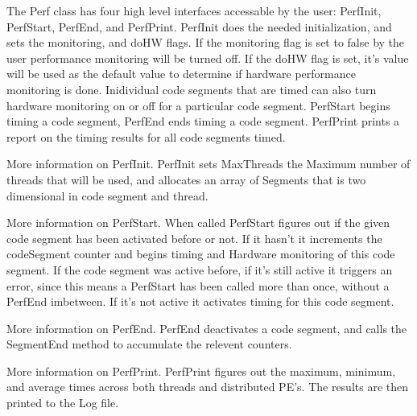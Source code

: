 %


The Perf class has four high level interfaces accessable by the user:
PerfInit, PerfStart, PerfEnd, and PerfPrint. PerfInit does the needed
initialization, and sets the monitoring, and doHW flags. If the monitoring
flag is set to false by the user performance monitoring will be turned
off. If the doHW flag is set, it's value will be used as the default value
to determine if hardware performance monitoring is done. Inidividual code
segments that are timed can also turn hardware monitoring on or off for
a particular code segment. PerfStart begins timing a code segment, PerfEnd
ends timing a code segment. PerfPrint prints a report on the timing results
for all code segments timed.

More information on PerfInit. PerfInit sets MaxThreads the Maximum number of 
threads that will be used, and allocates an array of Segments that is two
dimensional in code segment and thread.

More information on PerfStart. When called PerfStart figures out if the given
code segment has been activated before or not. If it hasn't it increments
the codeSegment counter and begins timing and Hardware monitoring of this
code segment. If the code segment was active before, if it's still active
it triggers an error, since this means a PerfStart has been called more than
once, without a PerfEnd imbetween. If it's not active it activates timing
for this code segment.

More information on PerfEnd. PerfEnd deactivates a code segment, and calls
the SegmentEnd method to accumulate the relevent counters.

More information on PerfPrint. PerfPrint figures out the maximum, minimum, and
average times across both threads and distributed PE's. The results are then printed
to the Log file.

